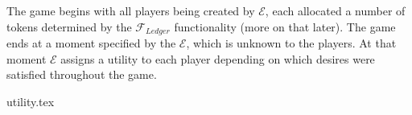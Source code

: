   The game begins with all players being created by $\mathcal{E}$, each allocated a number
  of tokens determined by the $\mathcal{F}_{Ledger}$ functionality (more on that later).
  The game ends at a moment specified by the $\mathcal{E}$, which is unknown to the
  players. At that moment $\mathcal{E}$ assigns a utility to each player depending on
  which desires were satisfied throughout the game.

  {utility.tex}
